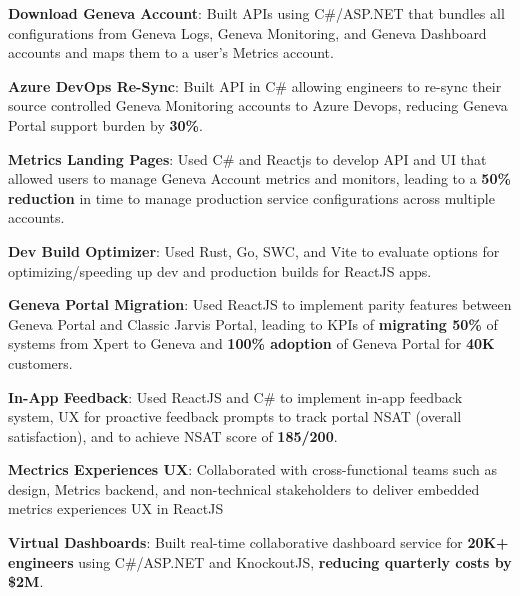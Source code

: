 \documentclass[letterpaper,11pt]{article}
\newcommand{\resumeItem}[2]{
  \item\small{
    \textbf{#1}{: #2 \vspace{-2pt}}
  }
}
\begin{document}
        \resumeItem{Download Geneva Account}{Built APIs using C\#/ASP.NET that bundles all configurations from Geneva Logs, Geneva Monitoring, and Geneva Dashboard accounts and maps them to a user's Metrics account.}
        
        \resumeItem{Azure DevOps Re-Sync}{Built API in C\# allowing engineers to re-sync their source controlled Geneva Monitoring accounts to Azure Devops, reducing Geneva Portal support burden  by \textbf{30\%}.}

        \resumeItem{Metrics Landing Pages}{
        Used C\# and Reactjs to develop API and UI that allowed users to manage Geneva Account metrics and monitors, leading to a \textbf{50\% reduction} in time to manage production service configurations across multiple accounts.}

        \resumeItem{Dev Build Optimizer}{Used Rust, Go, SWC, and Vite to evaluate options for optimizing/speeding up dev  and production builds for ReactJS apps.
        }


        \resumeItem{Geneva Portal Migration}{Used ReactJS to implement parity features  between Geneva Portal and Classic Jarvis Portal, leading to KPIs of \textbf{migrating 50\%} of systems from Xpert to Geneva and \textbf{100\% adoption} of Geneva Portal for \textbf{40K} customers.    
        }
        
       \resumeItem{In-App Feedback}{Used ReactJS and C\# to implement in-app feedback system, UX for proactive feedback prompts to track portal NSAT (overall satisfaction), and to achieve NSAT score of \textbf{185/200}.
        }

       \resumeItem{Mectrics Experiences UX}{Collaborated with cross-functional teams such as design, Metrics backend, and non-technical stakeholders to deliver embedded metrics experiences UX in ReactJS
       }

       \resumeItem{Virtual Dashboards}{Built real-time collaborative dashboard service for \textbf{20K+ engineers} using C\#/ASP.NET and KnockoutJS, \textbf{reducing quarterly costs by \$2M}.} 

\end{document}
